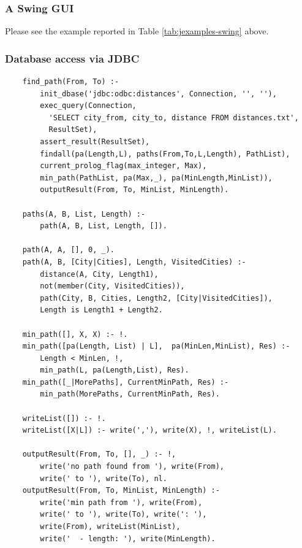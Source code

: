 \subsubsection{A Swing GUI}

Please see the example reported in Table \ref{tab:jexamples-swing} above.

\subsubsection{Database access via JDBC}

\begin{table}
\footnotesize
\begin{verbatim}
    find_path(From, To) :-
        init_dbase('jdbc:odbc:distances', Connection, '', ''),
        exec_query(Connection,
          'SELECT city_from, city_to, distance FROM distances.txt',
          ResultSet),
        assert_result(ResultSet),
        findall(pa(Length,L), paths(From,To,L,Length), PathList),
        current_prolog_flag(max_integer, Max),
        min_path(PathList, pa(Max,_), pa(MinLength,MinList)),
        outputResult(From, To, MinList, MinLength).

    paths(A, B, List, Length) :-
        path(A, B, List, Length, []).

    path(A, A, [], 0, _).
    path(A, B, [City|Cities], Length, VisitedCities) :-
        distance(A, City, Length1),
        not(member(City, VisitedCities)),
        path(City, B, Cities, Length2, [City|VisitedCities]),
        Length is Length1 + Length2.

    min_path([], X, X) :- !.
    min_path([pa(Length, List) | L],  pa(MinLen,MinList), Res) :-
        Length < MinLen, !,
        min_path(L, pa(Length,List), Res).
    min_path([_|MorePaths], CurrentMinPath, Res) :-
        min_path(MorePaths, CurrentMinPath, Res).

    writeList([]) :- !.
    writeList([X|L]) :- write(','), write(X), !, writeList(L).

    outputResult(From, To, [], _) :- !,
        write('no path found from '), write(From),
        write(' to '), write(To), nl.
    outputResult(From, To, MinList, MinLength) :-
        write('min path from '), write(From),
        write(' to '), write(To), write(': '),
        write(From), writeList(MinList),
        write('  - length: '), write(MinLength).
\end{verbatim}
\caption{Calculation of the minimum path between two given cities: the required data are fetched from a database via JDBC as shown in Table \ref{tab:jdbc-example-part2}.}
\label{tab:jdbc-example-part1}
\end{table}

